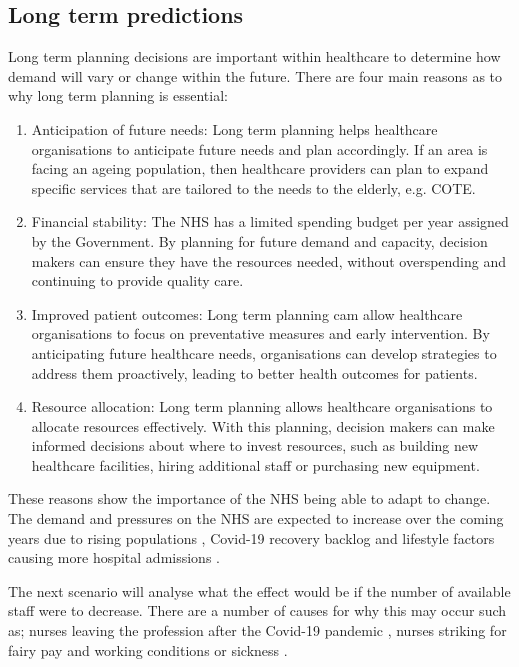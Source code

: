 \documentclass[../thesis.tex]{subfiles}
\begin{document}
\subsection{Long term predictions}\label{sec:scenario4}
Long term planning decisions are important within healthcare to determine how demand will vary or change within the future. There are four main reasons as to why long term planning is essential:
\begin{enumerate}
    \item Anticipation of future needs: Long term planning helps healthcare organisations to anticipate future needs and plan accordingly. If an area is facing an ageing population, then healthcare providers can plan to expand specific services that are tailored to the needs to the elderly, e.g. COTE.
    \item Financial stability: The NHS has a limited spending budget per year assigned by the Government. By planning for future demand and capacity, decision makers can ensure they have the resources needed, without overspending and continuing to provide quality care.
    \item Improved patient outcomes: Long term planning cam allow healthcare organisations to focus on preventative measures and early intervention. By anticipating future healthcare needs, organisations can develop strategies to address them proactively, leading to better health outcomes for patients.
    \item Resource allocation: Long term planning allows healthcare organisations to allocate resources effectively. With this planning, decision makers can make informed decisions about where to invest resources, such as building new healthcare facilities, hiring additional staff or purchasing new equipment.
\end{enumerate}

These reasons show the importance of the NHS being able to adapt to change. The demand and pressures on the NHS are expected to increase over the coming years due to rising populations \cite{WelshGovernment2022b}, Covid-19 recovery backlog \cite{AGW2022} and lifestyle factors causing more hospital admissions \cite{Luben2019}. 

The next scenario will analyse what the effect would be if the number of available staff were to decrease. There are a number of causes for why this may occur such as; nurses leaving the profession after the Covid-19 pandemic \cite{Devereux2022}, nurses striking for fairy pay and working conditions \cite{RCN2023} or sickness \cite{WelshGovernment2022a}.
\end{document}
